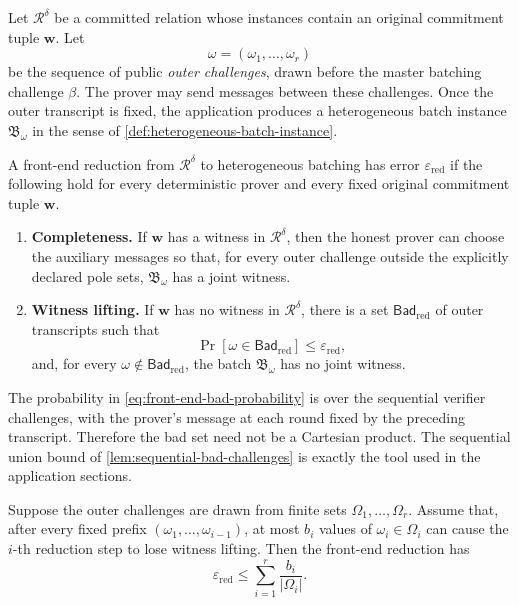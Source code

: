 Let $\mathcal R^\delta$ be a committed relation whose instances contain an original commitment tuple $\mathbf w$.  Let
\[
  \omega=(\omega_1,\ldots,\omega_r)
\]
be the sequence of public \emph{outer challenges}, drawn before the master batching challenge $\beta$.  The prover may send messages between these challenges.  Once the outer transcript is fixed, the application produces a heterogeneous batch instance $\mathfrak B_\omega$ in the sense of \cref{def:heterogeneous-batch-instance}.

\begin{definition}
\label{def:sound-front-end-reduction}
A front-end reduction from $\mathcal R^\delta$ to heterogeneous batching has error $\varepsilon_{\mathrm{red}}$ if the following hold for every deterministic prover and every fixed original commitment tuple $\mathbf w$.
\begin{enumerate}[label=(\arabic*),leftmargin=*]
  \item \textbf{Completeness.} If $\mathbf w$ has a witness in $\mathcal R^\delta$, then the honest prover can choose the auxiliary messages so that, for every outer challenge outside the explicitly declared pole sets, $\mathfrak B_\omega$ has a joint witness.
  \item \textbf{Witness lifting.} If $\mathbf w$ has no witness in $\mathcal R^\delta$, there is a set $\mathsf{Bad}_{\mathrm{red}}$ of outer transcripts such that
  \begin{equation}
    \Pr[\omega\in\mathsf{Bad}_{\mathrm{red}}]
    \le \varepsilon_{\mathrm{red}},
    \label{eq:front-end-bad-probability}
  \end{equation}
  and, for every $\omega\notin\mathsf{Bad}_{\mathrm{red}}$, the batch $\mathfrak B_\omega$ has no joint witness.
\end{enumerate}
\end{definition}

The probability in \eqref{eq:front-end-bad-probability} is over the sequential verifier challenges, with the prover's message at each round fixed by the preceding transcript.  Therefore the bad set need not be a Cartesian product.  The sequential union bound of \cref{lem:sequential-bad-challenges} is exactly the tool used in the application sections.

\begin{lemma}
\label{lem:global-sequential-accounting}
Suppose the outer challenges are drawn from finite sets $\Omega_1,\ldots,\Omega_r$.  Assume that, after every fixed prefix $(\omega_1,\ldots,\omega_{i-1})$, at most $b_i$ values of $\omega_i\in\Omega_i$ can cause the $i$-th reduction step to lose witness lifting.  Then the front-end reduction has
\begin{equation}
  \varepsilon_{\mathrm{red}}
  \le
  \sum_{i=1}^r\frac{b_i}{|\Omega_i|}.
  \label{eq:global-sequential-reduction-error}
\end{equation}
\end{lemma}

